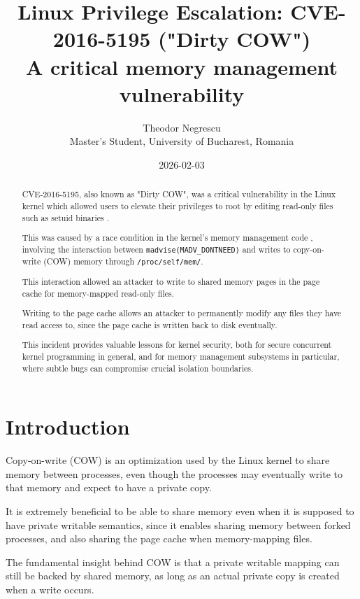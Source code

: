 \documentclass[a4paper,10pt,twocolumn,english]{article}
\title{Linux Privilege Escalation: CVE-2016-5195 ("Dirty COW")\\A critical memory management vulnerability}
\author{
    Theodor Negrescu\\
    \footnotesize Master's Student, University of Bucharest, Romania
}
\date{2026-02-03}
\newcommand{\code}[1]{\texttt{#1}}
\begin{document}
\maketitle


\begin{abstract} 
CVE-2016-5195, also known as "Dirty COW", was a critical vulnerability in the Linux kernel
which allowed users to elevate their privileges to root by editing read-only files such as setuid binaries \cite{cve2016-5195, arstechnica2016dirtycow}.

This was caused by a race condition in the kernel's memory management code \cite{chao2017dirtycow},
involving the interaction between \code{madvise(MADV\_DONTNEED)} and writes to copy-on-write (COW) memory through \code{/proc/self/mem/}.

This interaction allowed an attacker to write to shared memory pages in the page cache for memory-mapped read-only files.

Writing to the page cache allows an attacker to permanently modify any files they have read access to,
since the page cache is written back to disk eventually.

This incident provides valuable lessons for kernel security, both for secure concurrent kernel programming in general,
and for memory management subsystems in particular, where subtle bugs can compromise crucial isolation boundaries.
\end{abstract}


\section{Introduction}

Copy-on-write (COW) is an optimization used by the Linux kernel to share memory between processes,
even though the processes may eventually write to that memory and expect to have a private copy.

It is extremely beneficial to be able to share memory even when it is supposed to have private writable semantics,
since it enables sharing memory between forked processes, and also sharing the page cache when memory-mapping files.

The fundamental insight behind COW is that a private writable mapping can still be backed by shared memory,
as long as an actual private copy is created when a write occurs.
\end{document}
